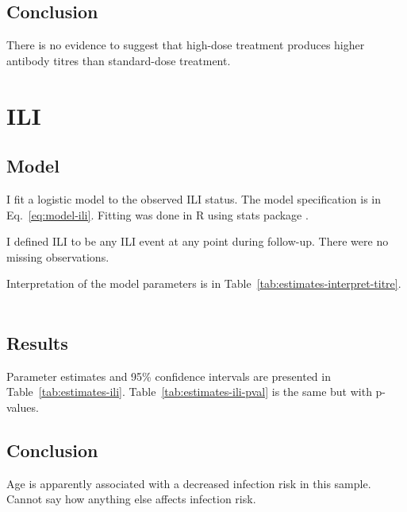 \documentclass[11pt]{article}
\begin{document}
\subsection{Conclusion}

There is no evidence to suggest that high-dose treatment produces
higher antibody
titres than standard-dose treatment.

\section{ILI}

\subsection{Model}

I fit a logistic model to the observed ILI status.
The model specification is in Eq.~\ref{eq:model-ili}.
Fitting was done in R using stats package \cite{R}.

I defined ILI to be any ILI event at any point during follow-up. There were no
missing observations.

Interpretation of the model parameters is in
Table~\ref{tab:estimates-interpret-titre}.

\begin{equation}
    \begin{gathered}
        \label{eq:model-ili}
        
    \end{gathered}
\end{equation}





\subsection{Results}

Parameter estimates and 95\% confidence intervals
are presented in Table~\ref{tab:estimates-ili}.
Table~\ref{tab:estimates-ili-pval} is the same but with p-values.





\subsection{Conclusion}

Age is apparently associated with a decreased infection risk in this sample.
Cannot say how anything else affects infection risk.
\end{document}
